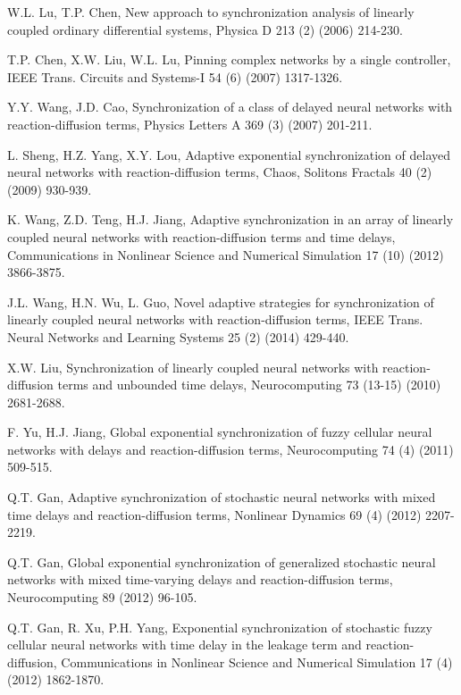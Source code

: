 \documentclass[review]{elsarticle}
\begin{document}
\begin{thebibliography}{99}
W.L. Lu, T.P. Chen, New approach to synchronization analysis of linearly coupled ordinary differential systems, Physica D 213 (2) (2006) 214-230.

T.P. Chen, X.W. Liu, W.L. Lu, Pinning complex networks by a single controller, IEEE Trans. Circuits and Systems-I 54 (6) (2007) 1317-1326.


Y.Y. Wang, J.D. Cao, Synchronization of a class of delayed neural networks with reaction-diffusion terms, Physics Letters A 369 (3) (2007) 201-211.

L. Sheng, H.Z. Yang, X.Y. Lou, Adaptive exponential synchronization of delayed neural networks with reaction-diffusion terms, Chaos, Solitons  Fractals 40 (2) (2009) 930-939.

K. Wang, Z.D. Teng, H.J. Jiang, Adaptive synchronization in an array of linearly coupled neural networks with reaction-diffusion terms and time delays, Communications in Nonlinear Science and Numerical Simulation 17 (10) (2012) 3866-3875.

J.L. Wang, H.N. Wu, L. Guo, Novel adaptive strategies for synchronization of linearly coupled neural networks with reaction-diffusion terms, IEEE Trans. Neural Networks and Learning Systems 25 (2) (2014) 429-440.

X.W. Liu, Synchronization of linearly coupled neural networks with reaction-diffusion terms and unbounded time delays, Neurocomputing 73 (13-15) (2010) 2681-2688.

F. Yu, H.J. Jiang, Global exponential synchronization of fuzzy cellular neural networks with delays and reaction-diffusion terms, Neurocomputing 74 (4) (2011) 509-515.

Q.T. Gan, Adaptive synchronization of stochastic neural networks with mixed time delays and reaction-diffusion terms, Nonlinear Dynamics 69 (4) (2012) 2207-2219.

Q.T. Gan, Global exponential synchronization of generalized stochastic neural networks with mixed time-varying delays and reaction-diffusion terms, Neurocomputing 89 (2012) 96-105.

Q.T. Gan, R. Xu, P.H. Yang, Exponential synchronization of stochastic fuzzy cellular neural networks with time delay in the leakage term and reaction-diffusion, Communications in Nonlinear Science and Numerical Simulation 17 (4) (2012) 1862-1870.


\end{thebibliography}
\end{document}
